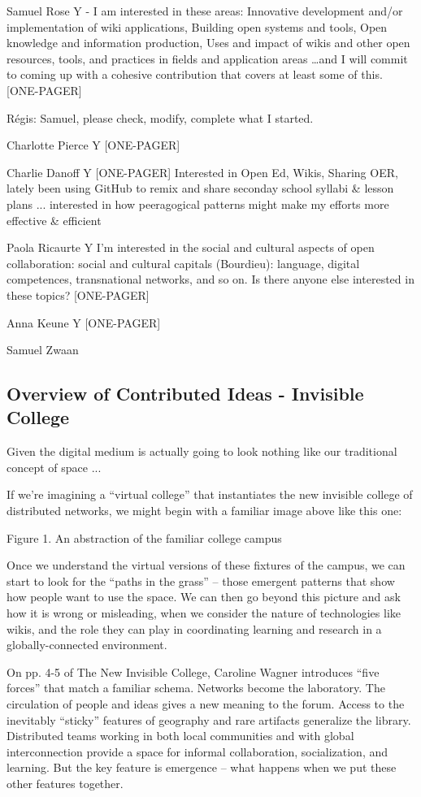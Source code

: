 \documentclass{acm_proc_article-sp}
\begin{document}
    Samuel Rose Y - I am interested in these areas: Innovative development and/or implementation of wiki applications, Building open systems and tools, Open knowledge and information production, Uses and impact of wikis and other open resources, tools, and practices in fields and application areas \ldots and I will commit to coming up with a cohesive contribution that covers at least some of this. [ONE-PAGER]

        R\'egis: Samuel, please check, modify, complete what I started. 

    Charlotte Pierce Y [ONE-PAGER]

    Charlie Danoff Y [ONE-PAGER] Interested in Open Ed, Wikis, Sharing OER, lately been using GitHub to remix and share seconday school syllabi \& lesson plans ... interested in how peeragogical patterns might make my efforts more effective \& efficient

    Paola Ricaurte Y I'm interested in the social and cultural aspects of open collaboration: social and cultural capitals (Bourdieu): language, digital competences, transnational networks, and so on. Is there anyone else interested in these topics? [ONE-PAGER]

    Anna Keune Y [ONE-PAGER]

    Samuel Zwaan 

\subsection{Overview of Contributed Ideas - Invisible College}

Given the digital medium is actually going to look nothing like our traditional concept of space ...

If we're imagining a ``virtual college'' that instantiates the new invisible college of distributed networks, we might begin with a familiar image above like this one:

Figure 1. An abstraction of the familiar college campus

Once we understand the virtual versions of these fixtures of the campus, we can start to look for the ``paths in the grass'' -- those emergent patterns that show how people want to use the space. We can then go beyond this picture and ask how it is wrong or misleading, when we consider the nature of technologies like wikis, and the role they can play in coordinating learning and research in a globally-connected environment.

On pp. 4-5 of The New Invisible College, Caroline Wagner introduces ``five forces'' that match a familiar schema. Networks become the laboratory. The circulation of people and ideas gives a new meaning to the forum. Access to the inevitably ``sticky'' features of geography and rare artifacts generalize the library. Distributed teams working in both local communities and with global interconnection provide a space for informal collaboration, socialization, and learning. But the key feature is emergence -- what happens when we put these other features together.
\end{document}
